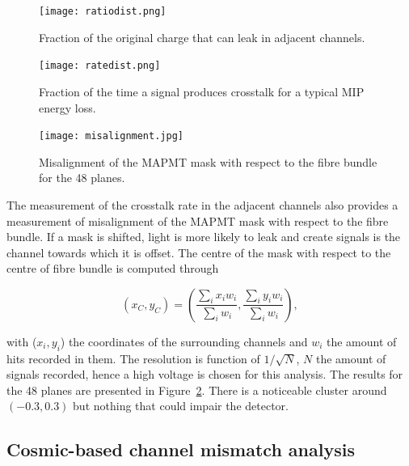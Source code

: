 \documentclass[a4paper,11pt]{article}
\begin{document}
\begin{figure}[htr!]
  \begin{minipage}[b]{.45\textwidth}
   \centering
   \texttt{[image: ratiodist.png]}
   \caption{Fraction of the original charge that can leak in adjacent channels.}
   \label{fig:ratio_dist}
  \end{minipage}
  \hspace{3mm}
  \begin{minipage}[b]{.45\textwidth}
   \centering
   \texttt{[image: ratedist.png]}
   \caption{Fraction of the time a signal produces crosstalk for a typical MIP energy loss.}
   \label{fig:rate_dist}
  \end{minipage}
\end{figure}

\begin{figure}[htr!]
   \centering
   \texttt{[image: misalignment.jpg]}
   \caption{Misalignment of the MAPMT mask with respect to the fibre bundle for the 48 planes.}
   \label{fig:misalignment}
\end{figure}

The measurement of the crosstalk rate in the adjacent channels also provides a measurement of misalignment of the MAPMT mask with respect to the fibre bundle.
If a mask is shifted, light is more likely to leak and create signals is the channel towards which it is offset. The centre of the mask with respect to the
centre of fibre bundle is computed through

\begin{equation}
(x_C,y_C)=\left(\frac{\sum_ix_iw_i}{\sum_iw_i},\frac{\sum_iy_iw_i}{\sum_iw_i}\right),
\end{equation}

with ($x_i,y_i$) the coordinates of the surrounding channels and $w_i$ the amount of hits recorded in them. The resolution is function of $1/\sqrt{N}$, $N$
the amount of signals recorded, hence a high voltage is chosen for this analysis. The results for the 48 planes are presented in Figure~\ref{fig:misalignment}.
There is a noticeable cluster around $(-0.3,0.3)$ but nothing that could impair the detector.

\subsection{Cosmic-based channel mismatch analysis}\label{sec:ch_mismatch}
\end{document}
